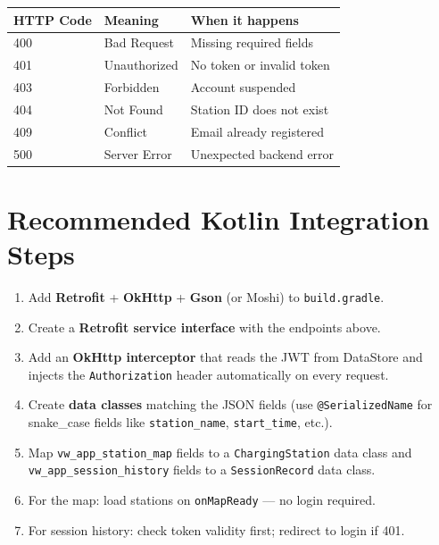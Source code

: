\documentclass[12pt,a4paper]{report}
\newcommand{\file}[1]{\texttt{\small #1}}
\begin{document}
\begin{center}
\begin{tabularx}{0.85\linewidth}{l l X}
  \toprule
  \rowcolor{tablehead}\color{white}\textbf{HTTP Code} & \color{white}\textbf{Meaning} & \color{white}\textbf{When it happens} \\
  \midrule
  400 & Bad Request     & Missing required fields \\
  \rowcolor{rowalt}
  401 & Unauthorized    & No token or invalid token \\
  403 & Forbidden       & Account suspended \\
  \rowcolor{rowalt}
  404 & Not Found       & Station ID does not exist \\
  409 & Conflict        & Email already registered \\
  \rowcolor{rowalt}
  500 & Server Error    & Unexpected backend error \\
  \bottomrule
\end{tabularx}
\end{center}

\section{Recommended Kotlin Integration Steps}

\begin{enumerate}
  \item Add \textbf{Retrofit} + \textbf{OkHttp} + \textbf{Gson} (or Moshi) to \file{build.gradle}.
  \item Create a \textbf{Retrofit service interface} with the endpoints above.
  \item Add an \textbf{OkHttp interceptor} that reads the JWT from DataStore and injects
        the \texttt{Authorization} header automatically on every request.
  \item Create \textbf{data classes} matching the JSON fields (use \texttt{@SerializedName} for
        snake\_case fields like \texttt{station\_name}, \texttt{start\_time}, etc.).
  \item Map \file{vw\_app\_station\_map} fields to a \texttt{ChargingStation} data class and
        \file{vw\_app\_session\_history} fields to a \texttt{SessionRecord} data class.
  \item For the map: load stations on \texttt{onMapReady} — no login required.
  \item For session history: check token validity first; redirect to login if 401.
\end{enumerate}
\end{document}
